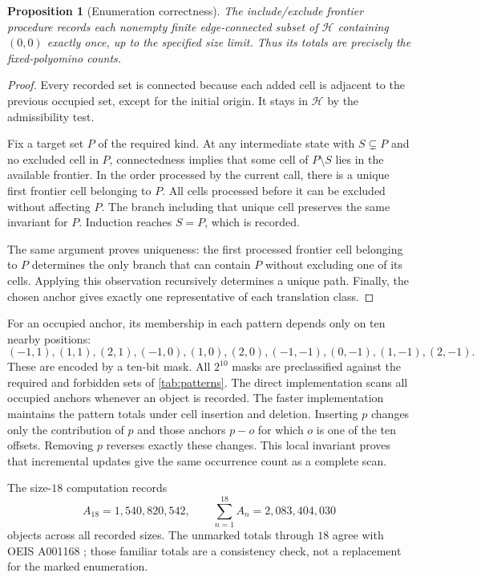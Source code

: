 \documentclass[11pt,a4paper]{article}
\newtheorem{proposition}[theorem]{Proposition}
\theoremstyle{definition}
\theoremstyle{remark}
\begin{document}
\begin{proposition}[Enumeration correctness]\label{prop:enumeration}
The include/exclude frontier procedure records each nonempty finite
edge-connected subset of $\mathcal H$ containing $(0,0)$ exactly once, up to
the specified size limit. Thus its totals are precisely the fixed-polyomino
counts.
\end{proposition}
\begin{proof}
Every recorded set is connected because each added cell is adjacent to the
previous occupied set, except for the initial origin. It stays in
$\mathcal H$ by the admissibility test.

Fix a target set $P$ of the required kind. At any intermediate state with
$S\subsetneq P$ and no excluded cell in $P$, connectedness implies that some
cell of $P\setminus S$ lies in the available frontier. In the order processed
by the current call, there is a unique first frontier cell belonging to $P$.
All cells processed before it can be excluded without affecting $P$.
The branch including that unique cell preserves the same invariant for $P$.
Induction reaches $S=P$, which is recorded.

The same argument proves uniqueness: the first processed frontier cell
belonging to $P$ determines the only branch that can contain $P$ without
excluding one of its cells. Applying this observation recursively determines
a unique path. Finally, the chosen anchor gives exactly one representative
of each translation class.
\end{proof}

For an occupied anchor, its membership in each pattern depends only on ten
nearby positions:
\[
 (-1,1),(1,1),(2,1),(-1,0),(1,0),(2,0),
 (-1,-1),(0,-1),(1,-1),(2,-1).
\]
These are encoded by a ten-bit mask. All $2^{10}$ masks are preclassified
against the required and forbidden sets of \cref{tab:patterns}.
The direct implementation scans all occupied anchors whenever an object is
recorded. The faster implementation maintains the pattern totals under cell
insertion and deletion. Inserting $p$ changes only the contribution of $p$
and those anchors $p-o$ for which $o$ is one of the ten offsets. Removing $p$
reverses exactly these changes. This local invariant proves that incremental
updates give the same occurrence count as a complete scan.

The size-$18$ computation records
\[
 A_{18}=1,540,820,542,\qquad
 \sum_{n=1}^{18}A_n=2,083,404,030
\]
objects across all recorded sizes. The unmarked totals through $18$ agree
with OEIS A001168 \cite{oeis}; those familiar totals are a consistency check,
not a replacement for the marked enumeration.
\end{document}

